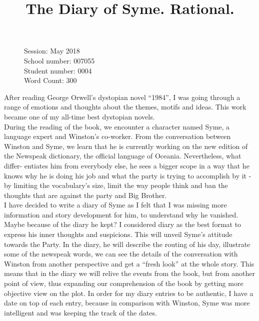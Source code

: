 \documentclass[12pt,a4paper]{article}
\title{The Diary of Syme. Rational.}
\author{}
\date{}
\begin{document}
\maketitle
\begin{flushleft}
  \begin{figure}
    Session: May 2018\\
    School number: 007055\\
    Student number: 0004\\
    Word Count: 300\\
    \end{figure}
  \end{flushleft}
\newpage

After reading George Orwell’s dystopian novel “1984”, I was going through a range of emotions and thoughts about the themes, motifs and ideas. This work became one of my all-time best dystopian novels.\\

During the reading of the book, we encounter a character named Syme, a language expert and Winston’s co-worker. From the conversation between Winston and Syme, we learn that he is currently working on the new edition of the Newspeak dictionary, the official language of Oceania. Nevertheless, what differ- entiates him from everybody else, he sees a bigger scope in a way that he knows why he is doing his job and what the party is trying to accomplish by it - by limiting the vocabulary’s size, limit the way people think and ban the thoughts that are against the party and Big Brother. \\

I have decided to write a diary of Syme as I felt that I was missing more information and story development for him, to understand why he vanished. Maybe because of the diary he kept? I considered diary as the best format to express his inner thoughts and suspicions. This will unveil Syme’s attitude towards the Party. In the diary, he will describe the routing of his day, illustrate some of the newspeak words, we can see the details of the conversation with Winston from another perspective and get a “fresh look” at the whole story. This means that in the diary we will relive the events from the book, but from another point of view, thus expanding our comprehension of the book by getting more objective view on the plot. In order for my diary entries to be authentic, I have a date on top of each entry, because in comparison with Winston, Syme was more intelligent and was keeping the track of the dates.\\
\end{document}
